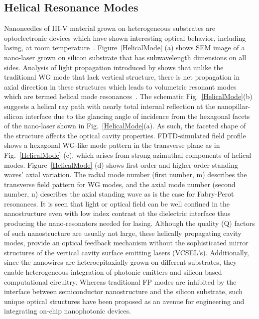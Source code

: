\subsection{Helical Resonance Modes}

Nanoneedles of III-V material grown on heterogeneous substrates are
optoelectronic devices which have shown interesting optical behavior, including
lasing, at room temperature~\cite{Chen:2011cg}. Figure~\ref{HelicalMode} (a)
shows SEM image of a nano-laser grown on silicon substrate that has
subwavelength dimensions on all sides. Analysis of light propagation introduced
by shows that unlike the traditional WG mode that lack vertical structure,
there is net propagation in axial direction in these structures which leads to
volumetric resonant modes which are termed helical mode
resonances~\cite{Chen:2011cg}. The schematic Fig.~\ref{HelicalMode}(b)
suggests a helical ray path with nearly total internal reflection at the
nanopillar-silicon interface due to the glancing angle of incidence from the
hexagonal facets of the nano-laser shown in Fig.~\ref{HelicalMode}(a). As such,
the faceted shape of the structure affects the optical cavity properties.
FDTD-simulated field profile shows a hexagonal WG-like mode pattern  in the
transverse plane as in Fig.~\ref{HelicalMode} (c), which arises from strong
azimuthal components of helical modes.  Figure~\ref{HelicalMode} (d) shows
first-order and higher-order standing waves’ axial variation. The radial mode
number (first number, m) describes the transverse field pattern for WG modes,
and the axial mode number (second number, n) describes the axial standing wave
as is the case for Fabry-Perot resonances. It is seen that light or optical
field can be well confined in the nanostructure even with low index contrast at
the dielectric interface thus producing the nano-resonators needed for lasing.
Although the quality (Q) factors of such nanostructure are usually not large,
these helically propagating cavity modes, provide an optical feedback mechanism
without the sophisticated mirror structures of the vertical cavity surface
emitting lasers (VCSEL’s). Additionally, since the nanowires are
heteroepitaxially grown on different substrates, they enable heterogeneous
integration of photonic emitters and silicon based computational circuitry.
Whereas traditional FP modes are inhibited by the interface between
semiconductor nanostructure and the silicon substrate, such unique optical
structures have been proposed as an avenue for engineering and integrating
on-chip nanophotonic devices.

